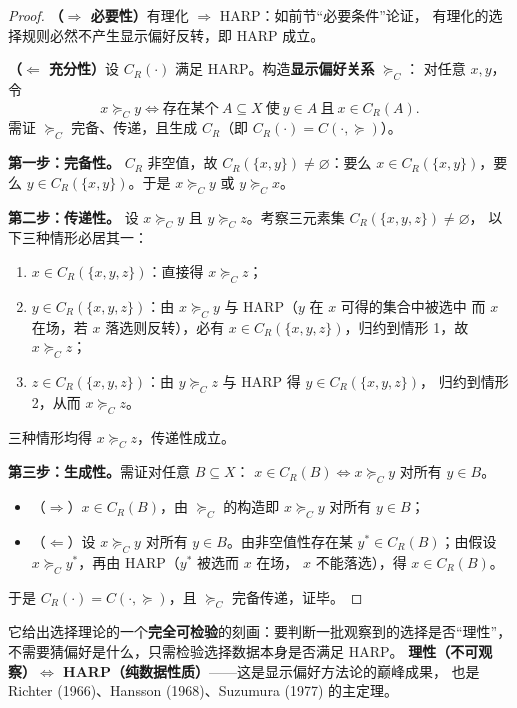 \begin{proof}
\textbf{（$\Rightarrow$ 必要性）}有理化 $\Rightarrow$ HARP：如前节“必要条件”论证，
有理化的选择规则必然不产生显示偏好反转，即 HARP 成立。

\textbf{（$\Leftarrow$ 充分性）}设 $C_R(\cdot)$ 满足 HARP。构造\textbf{显示偏好关系} $\succeq_C$：
对任意 $x,y$，令
\[
x\succeq_C y \iff \text{存在某个}\ A\subseteq X\ \text{使}\ y\in A\ \text{且}\ x\in C_R(A).
\]
需证 $\succeq_C$ 完备、传递，且生成 $C_R$（即 $C_R(\cdot)=C(\cdot,\succeq)$）。

\textbf{第一步：完备性。}
$C_R$ 非空值，故 $C_R(\{x,y\})\neq\varnothing$：要么 $x\in C_R(\{x,y\})$，要么
$y\in C_R(\{x,y\})$。于是 $x\succeq_C y$ 或 $y\succeq_C x$。

\textbf{第二步：传递性。}
设 $x\succeq_C y$ 且 $y\succeq_C z$。考察三元素集 $C_R(\{x,y,z\})\neq\varnothing$，
以下三种情形必居其一：
\begin{enumerate}
  \item $x\in C_R(\{x,y,z\})$：直接得 $x\succeq_C z$；
  \item $y\in C_R(\{x,y,z\})$：由 $x\succeq_C y$ 与 HARP（$y$ 在 $x$ 可得的集合中被选中
  而 $x$ 在场，若 $x$ 落选则反转），必有 $x\in C_R(\{x,y,z\})$，归约到情形 1，故 $x\succeq_C z$；
  \item $z\in C_R(\{x,y,z\})$：由 $y\succeq_C z$ 与 HARP 得 $y\in C_R(\{x,y,z\})$，
  归约到情形 2，从而 $x\succeq_C z$。
\end{enumerate}
三种情形均得 $x\succeq_C z$，传递性成立。

\textbf{第三步：生成性。}需证对任意 $B\subseteq X$：
$x\in C_R(B) \iff x\succeq_C y$ 对所有 $y\in B$。
\begin{itemize}
  \item（$\Rightarrow$）$x\in C_R(B)$，由 $\succeq_C$ 的构造即 $x\succeq_C y$ 对所有 $y\in B$；
  \item（$\Leftarrow$）设 $x\succeq_C y$ 对所有 $y\in B$。由非空值性存在某
  $y^*\in C_R(B)$；由假设 $x\succeq_C y^*$，再由 HARP（$y^*$ 被选而 $x$ 在场，
  $x$ 不能落选），得 $x\in C_R(B)$。
\end{itemize}
于是 $C_R(\cdot)=C(\cdot,\succeq)$，且 $\succeq_C$ 完备传递，证毕。
\end{proof}

\begin{remark}[这个定理为什么重要]
它给出选择理论的一个\textbf{完全可检验}的刻画：要判断一批观察到的选择是否“理性”，
不需要猜偏好是什么，只需检验选择数据本身是否满足 HARP。
\textbf{理性（不可观察）$\iff$ HARP（纯数据性质）}——这是显示偏好方法论的巅峰成果，
也是 Richter (1966)、Hansson (1968)、Suzumura (1977) 的主定理。
\end{remark}

